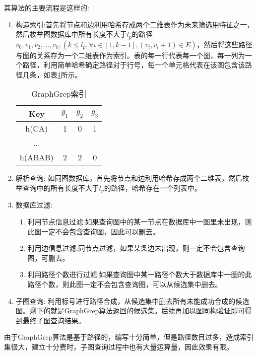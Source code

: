 \documentclass{XDBAthesis}
\begin{document}
其算法的主要流程是这样的:
\begin{enumerate}
    \item 构造索引:首先将节点和边利用哈希存成两个二维表作为未来筛选用特征之一，然后枚举图数据库中所有长度不大于$l_p $的路径$v_0 ,v_1 ,v_2 ,...,v_k ,( k\leq l_p ,\forall i\in [1,k-1],(v_i ,v_i+1)\in E) $，然后将这些路径与图的关系存为一个二维表作为索引。表的每一行代表每一个图，每一列为一个路径，利用简单哈希确定路径对于行号，每一个单元格代表在该图包含该路径几条，如表\ref{tb:grepIndex}所示。

\begin{table}[htb]
    \centering
    \begin{tabular}{|c|c|c|c|}
        \hline
        Key&$g_1 $&$g_2 $&$g_3 $ \\ \hline
        h(CA)&1&0&1 \\ \hline
        ...&&&\\ \hline
        h(ABAB)&2&2&0 \\
        \hline
    \end{tabular}
    \caption{GraphGrep索引}
    \label{tb:grepIndex}
\end{table}

    \item 解析查询: 如同图数据库，首先将节点和边利用哈希存成两个二维表，然后枚举查询中的所有长度不大于$l_p $的路径，哈希存在一个列表中。
    \item 数据库过滤: 
        \begin{enumerate}
            \item 利用节点信息过滤:如果查询图中的某一节点在数据库中一图里未出现，则此图一定不会包含查询图，因此可以删去。
            \item 利用边信息过滤:同节点过滤，如果某条边未出现，则一定不会包含查询图，可删去。
            \item 利用路径个数进行过滤:如果查询图中某一路径个数大于数据库中一图的此路径个数，则此图一定不会包含查询图，可以从候选集中删去。
        \end{enumerate}
    \item 子图查询: 利用标号进行路径合成，从候选集中删去所有未能成功合成的候选图。剩下的就是GraphGrep算法返回的候选集。后续再加以图同构验证即可得到最终子图查询结果。
    
\end{enumerate}

由于GraphGrep算法是基于路径的，编写十分简单，但是路径数目过多，造成索引集很大，建立十分费时，子图查询过程中也有大量运算量，因此效果有限。
\end{document}
